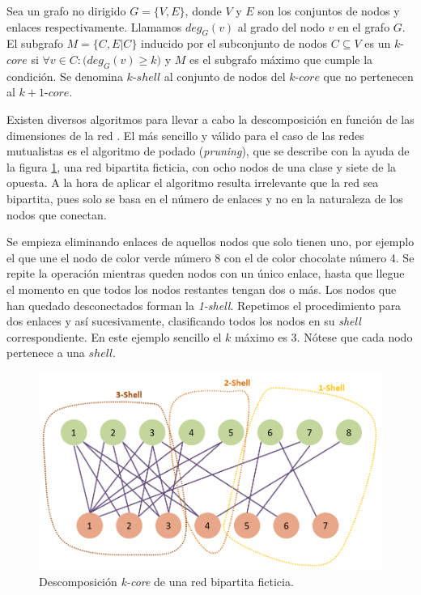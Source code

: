 \begin{theo} 
Sea un grafo no dirigido $G = \{V, E\}$, donde $V$ y $E$ son los conjuntos de nodos y enlaces respectivamente. Llamamos $deg_G(v)$ al grado del nodo $v$ en el grafo $G$. El subgrafo $M = \{C, E|C\}$ inducido por el subconjunto de nodos $C \subseteq V$ es
un $k$-$core$ si $\forall v \in C: \big( deg_G(v) \geq k \big)$ y $M$ es el subgrafo máximo que cumple la condición. Se denomina $k$-$shell$ al conjunto de nodos del $k$-$core$ que no pertenecen al $k+1$-$core$.
\label{ESTATICA_def_kcore}
\end{theo}

Existen diversos algoritmos para llevar a cabo la descomposición en función de las dimensiones de la red \cite{montresor2013distributed}. El más sencillo y válido para el caso de las redes mutualistas es el algoritmo de podado (\textit{pruning}), que se describe con la ayuda de la figura \ref{fig:ESTATICA_kcore_decomposition_example}, una red bipartita ficticia, con ocho nodos de una clase y siete de la opuesta. A la hora de aplicar el algoritmo resulta irrelevante que la red sea bipartita, pues solo se basa en el número de enlaces y no en la naturaleza de los nodos que conectan.

Se empieza eliminando enlaces de aquellos nodos que solo tienen uno, por ejemplo el que une el nodo de color verde número 8 con el de color chocolate número 4. Se repite la operación mientras queden nodos con un único enlace, hasta que llegue el momento en que todos los nodos restantes tengan dos o más. Los nodos que han quedado desconectados forman la \textit{1-shell}. Repetimos el procedimiento para dos enlaces y así sucesivamente, clasificando todos los nodos en su \textit{shell} correspondiente. En este ejemplo sencillo el $k$ máximo es 3. Nótese que cada nodo pertenece a una $shell$.

\begin{figure}[h!]
\centering
\includegraphics[scale=0.5]{Figures/ESTATICA_kcore_decomposition_example.png}
\caption{Descomposición \textit{k-core} de una red bipartita ficticia.}
\label{fig:ESTATICA_kcore_decomposition_example}
\end{figure}

